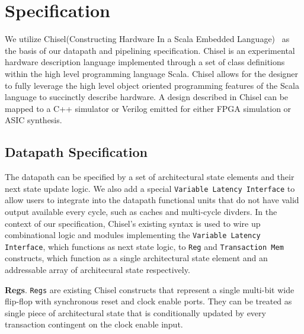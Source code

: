 \section{Specification}
We utilize Chisel(Constructing Hardware In a Scala Embedded
Language)~\cite{Bachrach:2012} as the basis of our datapath and
pipelining specification. Chisel is an experimental hardware
description language implemented through a set of class definitions
within the high level programming language Scala. Chisel allows for
the designer to fully leverage the high level object oriented
programming features of the Scala language to succinctly describe
hardware. A design described in Chisel can be mapped to a C++
simulator or Verilog emitted for either FPGA simulation or ASIC
synthesis.

\subsection{Datapath Specification}
The datapath can be specified by a set of architectural state elements
and their next state update logic. We also add a special {\tt Variable
Latency Interface} to allow users to integrate into the datapath
functional units that do not have valid output available every cycle,
such as caches and multi-cycle divders. In the context of our
specification, Chisel's existing syntax is used to wire up
combinational logic and modules implementing the {\tt Variable Latency
Interface}, which functions as next state logic, to {\tt Reg} and {\tt Transaction
Mem} constructs, which function as a single architectural state element
and an addressable array of architecural state respectively.

{\bf Regs}. {\tt Regs} are existing Chisel constructs that represent a
single multi-bit wide flip-flop with synchronous reset and clock
enable ports. They can be treated as single piece of architectural
state that is conditionally updated by every transaction contingent on
the clock enable input.

